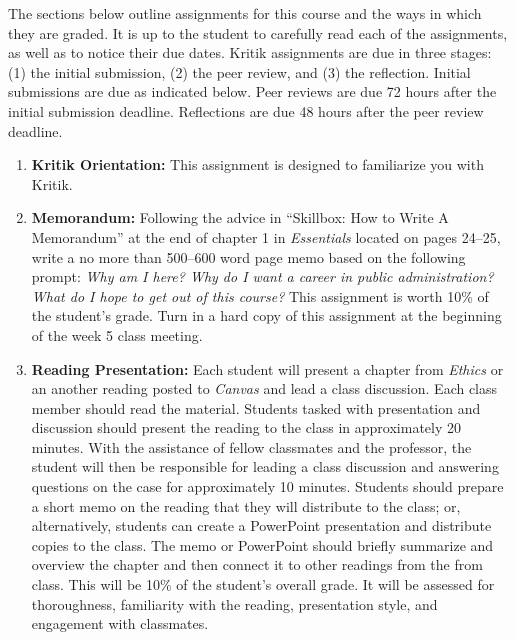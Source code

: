 \documentclass[10pt, letterpaper]{article}
\begin{document}
The sections below outline assignments for this course and the ways in which they are graded. It is up to the student to carefully read each of the assignments, as well as to notice their due dates. Kritik assignments are due in three stages: (1) the initial submission, (2) the peer review, and (3) the reflection. Initial submissions are due as indicated below. Peer reviews are due 72 hours after the initial submission deadline. Reflections are due 48 hours after the peer review deadline.
	\begin{enumerate}

        \item \textbf{Kritik Orientation:} This assignment is designed to familiarize you with Kritik.
		
		\item \textbf{Memorandum:} Following the advice in ``Skillbox: How to Write A Memorandum'' at the end of chapter 1 in \emph{Essentials} \citep{GUY2022} located on pages 24--25, write a no more than 500--600 word page memo based on the following prompt: \emph{Why am I here? Why do I want a career in public administration? What do I hope to get out of this course?} This assignment is worth 10\% of the student's grade. Turn in a hard copy of this assignment at the beginning of the week 5 class meeting.
		
		\item \textbf{Reading Presentation:} Each student will present a chapter from \emph{Ethics} \citep{DOUCETTE2020} or an another reading posted to \emph{Canvas} and lead a class discussion. Each class member should read the material. Students tasked with presentation and discussion should present the reading to the class in approximately 20 minutes. With the assistance of fellow classmates and the professor, the student will then be responsible for leading a class discussion and answering questions on the case for approximately 10 minutes. Students should prepare a short memo on the reading that they will distribute to the class; or, alternatively, students can create a PowerPoint presentation and distribute copies to the class. The memo or PowerPoint should briefly summarize and overview the chapter and then connect it to other readings from the from class. This will be 10\% of the student's overall grade. It will be assessed for thoroughness, familiarity with the reading, presentation style, and engagement with classmates.
		

\end{enumerate}
\end{document}

